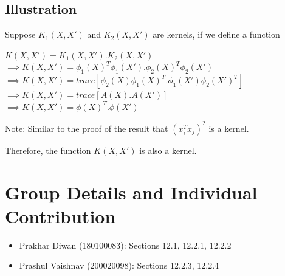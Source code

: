 \documentclass[11pt, twosides]{article}
\begin{document}
\subsection{Illustration}
Suppose $K_1(X,X')$ and $K_2(X,X')$ are kernels, if we define a function
\begin{center}
$K(X,X') = K_1(X,X').K_2(X,X')$\\
$\implies K(X,X') = \phi_1(X)^T\phi_1(X').\phi_2(X)^T\phi_2(X')$\\
$\implies K(X,X') = trace [\phi_2(X)\phi_1(X)^T.\phi_1(X')\phi_2(X')^T]$\\
$\implies K(X,X') = trace [A(X).A(X')]$\\
$\implies K(X,X') = \phi(X)^T.\phi(X')$\\
\end{center}
Note: Similar to the proof of the result that $(x_i^Tx_j)^2$ is a kernel.

Therefore, the function $K(X,X')$ is also a kernel.

\section{Group Details and Individual Contribution}
\begin{itemize}
    \item Prakhar Diwan (180100083): Sections 12.1, 12.2.1, 12.2.2
    \item Prashul Vaishnav (200020098): Sections 12.2.3, 12.2.4
\end{itemize}
\end{document}
